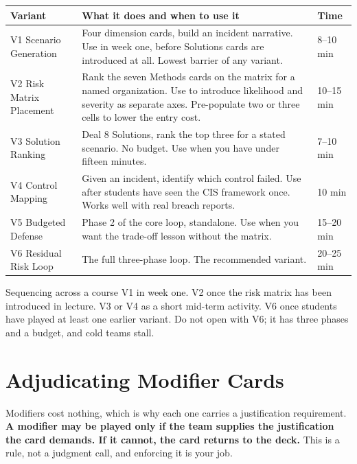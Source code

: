 \documentclass[11pt,letterpaper]{article}
\begin{document}
\begin{center}
\small
\begin{tabularx}{\textwidth}{@{}l X l@{}}
\toprule
\textbf{Variant} & \textbf{What it does and when to use it} & \textbf{Time} \\
\midrule
V1 Scenario Generation & Four dimension cards, build an incident narrative. Use in week one, before Solutions cards are introduced at all. Lowest barrier of any variant. & 8--10 min \\
V2 Risk Matrix Placement & Rank the seven Methods cards on the matrix for a named organization. Use to introduce likelihood and severity as separate axes. Pre-populate two or three cells to lower the entry cost. & 10--15 min \\
V3 Solution Ranking & Deal 8 Solutions, rank the top three for a stated scenario. No budget. Use when you have under fifteen minutes. & 7--10 min \\
V4 Control Mapping & Given an incident, identify which control failed. Use after students have seen the CIS framework once. Works well with real breach reports. & 10 min \\
V5 Budgeted Defense & Phase 2 of the core loop, standalone. Use when you want the trade-off lesson without the matrix. & 15--20 min \\
V6 Residual Risk Loop & The full three-phase loop. The recommended variant. & 20--25 min \\
\bottomrule
\end{tabularx}
\end{center}

\begin{note}{Sequencing across a course}
V1 in week one. V2 once the risk matrix has been introduced in lecture. V3 or V4
as a short mid-term activity. V6 once students have played at least one earlier
variant. Do not open with V6; it has three phases and a budget, and cold teams
stall.
\end{note}

\section{Adjudicating Modifier Cards}

Modifiers cost nothing, which is why each one carries a justification
requirement. \textbf{A modifier may be played only if the team supplies the
justification the card demands. If it cannot, the card returns to the deck.}
This is a rule, not a judgment call, and enforcing it is your job.
\end{document}

